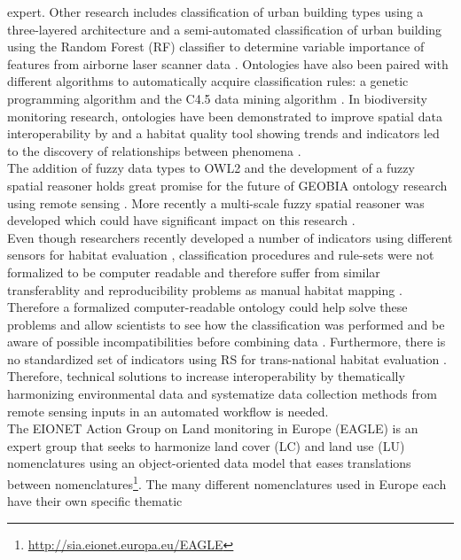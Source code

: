 \documentclass[authoryear, review,12pt,number]{elsarticle}
\begin{document}
expert\citep{Lucas2015}. Other research includes classification of urban
building types using a three-layered architecture \citep{diSciascio2013} and a
semi-automated classification of urban building using the Random Forest (RF)
classifier to determine variable importance of features from airborne laser
scanner data \citep{Belgiu2014}. Ontologies have also been paired with
different algorithms to automatically acquire classification rules: a genetic
programming algorithm \citep{Forestier2012470} and the C4.5 data mining
algorithm \citep{Sheeren2006ML}. In biodiversity monitoring research, ontologies
have been demonstrated to improve spatial data interoperability by
\citep{Nieland2015} and a habitat quality tool showing trends and indicators
led to the discovery of relationships between phenomena \citep{Perez-Luque2015}. 
\\
The addition of fuzzy data types to OWL2 and the development of a fuzzy spatial
reasoner holds great promise for the future of GEOBIA ontology research using
remote sensing \citep{Bobillo2011, Bobillo2015}. More recently a multi-scale
fuzzy spatial reasoner was developed which could have significant impact on this
research \citep{Argyridis2015}.
\\
Even though researchers recently developed a number of indicators using
different sensors for habitat evaluation \citep{Nagendra2013}, classification
procedures and rule-sets were not formalized to be computer readable and
therefore suffer from similar transferablity and reproducibility problems as
manual habitat mapping \citep{Arvor2013, Nieland2015}.  Therefore a formalized
computer-readable ontology could help solve these problems and allow scientists
to see how the classification was performed and be aware of possible
incompatibilities before combining data \citep{Janowicz2012}. 
Furthermore, there is no standardized set of indicators
using RS for trans-national habitat evaluation \citep{Lucas2015}. Therefore,
technical solutions to increase interoperability by thematically harmonizing
environmental data and systematize data collection methods from remote sensing
inputs in an automated workflow is needed. 
\\
The EIONET Action Group on Land monitoring in Europe (EAGLE) is an expert group
that seeks to harmonize land cover (LC) and land use (LU) nomenclatures using an
object-oriented data model that eases translations between
nomenclatures\footnote{\url{http://sia.eionet.europa.eu/EAGLE}}. The many
different nomenclatures used in Europe each have their own specific thematic
\end{document}

